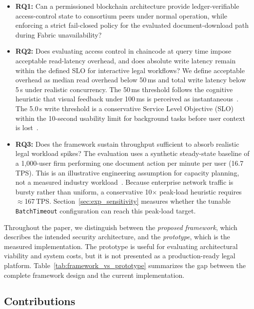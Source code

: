 \documentclass{ieeeaccess}
\begin{document}
\begin{itemize}
\item \textbf{RQ1:} Can a permissioned blockchain architecture provide
ledger-verifiable access-control state to consortium peers under normal
operation, while enforcing a strict fail-closed policy for the evaluated
document-download path during Fabric unavailability?

\item \textbf{RQ2:} Does evaluating access control in chaincode at query time
impose acceptable read-latency overhead, and does absolute write latency remain
within the defined \textsc{SLO} for interactive legal workflows? We define
acceptable overhead as median read overhead below 50\,ms and total write
latency below 5\,s under realistic concurrency. The 50\,ms threshold follows
the cognitive heuristic that visual feedback under 100\,ms is perceived as
instantaneous~\cite{nielsen1993usability, miller1968response}. The 5.0\,s
write threshold is a conservative Service Level Objective (SLO) within the
10-second usability limit for background tasks before user context is
lost~\cite{nielsen1993usability}.

\item \textbf{RQ3:} Does the framework sustain throughput sufficient to absorb
realistic legal workload spikes? The evaluation uses a synthetic steady-state
baseline of a 1,000-user firm performing one document action per minute per
user (16.7\,TPS). This is an illustrative engineering assumption for capacity
planning, not a measured industry workload~\cite{aba2023,ilta2023}. Because
enterprise network traffic is bursty rather than uniform, a conservative
10$\times$ peak-load heuristic requires $\approx$167\,TPS. Section~\ref{sec:exp_sensitivity}
measures whether the tunable \texttt{BatchTimeout} configuration can reach
this peak-load target.

\end{itemize}

Throughout the paper, we distinguish between the \emph{proposed
framework}, which describes the intended security architecture, and
the \emph{prototype}, which is the measured implementation. The
prototype is useful for evaluating architectural viability and system
costs, but it is not presented as a production-ready legal platform.
Table~\ref{tab:framework_vs_prototype} summarizes the gap between
the complete framework design and the current implementation.

\subsection{Contributions}
\label{sec:contributions}
\end{document}
